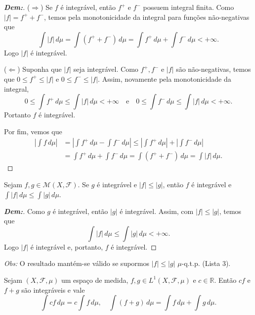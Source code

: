 \begin{proof}[\textbf{Dem:}]
($\Rightarrow$) Se $f$ é integrável, então $f^+$ e $f^-$ possuem integral finita. Como $|f| = f^+ + f^-$, temos pela monotonicidade da integral para funções não-negativas que
$$ \int |f| \, d\mu = \int (f^+ + f^-) \, d\mu = \int f^+ \, d\mu + \int f^- \, d\mu < +\infty. $$
Logo $|f|$ é integrável.

($\Leftarrow$) Suponha que $|f|$ seja integrável. Como $f^+, f^-$ e $|f|$ são não-negativas, temos que $0 \le f^+ \le |f|$ e $0 \le f^- \le |f|$.
Assim, novamente pela monotonicidade da integral,
$$ 0 \le \int f^+ \, d\mu \le \int |f| \, d\mu < +\infty \quad \text{e} \quad 0 \le \int f^- \, d\mu \le \int |f| \, d\mu < +\infty. $$
Portanto $f$ é integrável.

\noindent
Por fim, vemos que
\begin{align*}
 \left| \int f \, d\mu \right| 
  &= \left| \int f^+ \, d\mu - \int f^- \, d\mu \right| 
  \le \left| \int f^+ \, d\mu \right| + \left| \int f^- \, d\mu \right|\\ 
  &= \int f^+ \, d\mu + \int f^- \, d\mu = \int (f^+ + f^-) \, d\mu = \int |f| \, d\mu. 
\end{align*}
\end{proof}

\begin{corollary*}{}
Sejam $f, g \in \mathcal{M}(X, \mathcal{F})$. Se $g$ é integrável e $|f| \le |g|$, então $f$ é integrável e $\int |f| \, d\mu \le \int |g| \, d\mu$.
\end{corollary*}

\begin{proof}[\textbf{Dem:}]
Como $g$ é integrável, então $|g|$ é integrável. Assim, com $|f| \le |g|$, temos que
$$ \int |f| \, d\mu \le \int |g| \, d\mu < +\infty. $$
Logo $|f|$ é integrável e, portanto, $f$ é integrável.
\end{proof}

\noindent
\textit{Obs:} O resultado mantém-se válido se supormos $|f| \le |g|$ $\mu$-q.t.p. (Lista 3).

\begin{prop*}{}
Sejam $(X, \mathcal{F}, \mu)$ um espaço de medida, $f, g \in L^1(X, \mathcal{F}, \mu)$ e $c \in \mathbb{R}$. Então $cf$ e $f+g$ são integráveis e vale
$$ \int cf \, d\mu = c \int f \, d\mu, \quad \int (f+g) \, d\mu = \int f \, d\mu + \int g \, d\mu. $$
\end{prop*}

